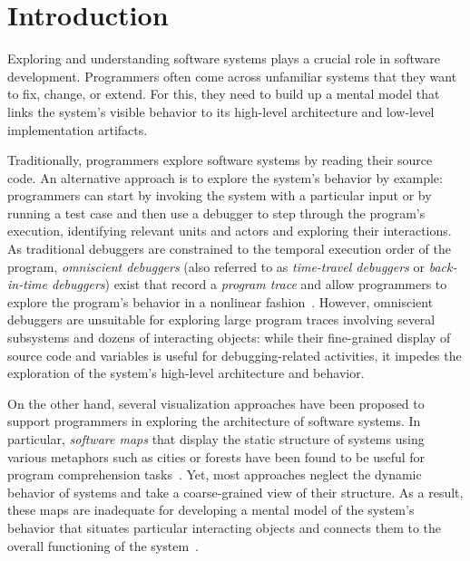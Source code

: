 \section{Introduction}
\label{sec:introduction}

Exploring and understanding software systems plays a crucial role in software development.
Programmers often come across unfamiliar systems that they want to fix, change, or extend.
For this, they need to build up a mental model that links the system's visible behavior to its high-level architecture and low-level implementation artifacts.

Traditionally, programmers explore software systems by reading their source code.
An alternative approach is to explore the system's behavior by example:
programmers can start by invoking the system with a particular input or by running a test case and then use a debugger to step through the program's execution, identifying relevant units and actors and exploring their interactions.
As traditional debuggers are constrained to the temporal execution order of the program, \emph{omniscient debuggers} (also referred to as \emph{time-travel debuggers} or \emph{back-in-time debuggers}) exist that record a \emph{program trace} and allow programmers to explore the program's behavior in a nonlinear fashion~\cite{lewis2003debugging,hofer2006design,pothier2009back,lienhard2008practical,perscheid2012test}.
However, omniscient debuggers are unsuitable for exploring large program traces involving several subsystems and dozens of interacting objects:
while their fine-grained display of source code and variables is useful for debugging-related activities, it impedes the exploration of the system's high-level architecture and behavior.

On the other hand, several visualization approaches have been proposed to support programmers in exploring the architecture of software systems.
In particular, \emph{software maps} that display the static structure of systems using various metaphors such as cities or forests have been found to be useful for program comprehension tasks~\cite{wettel2007visualizing,atzberger2021softwareforest,limberger2022visual}.
Yet, most approaches neglect the dynamic behavior of systems and take a coarse-grained view of their structure.
As a result, these maps are inadequate for developing a mental model of the system's behavior that situates particular interacting objects and connects them to the overall functioning of the system~\cite{vonMayrhauser1995program}.


